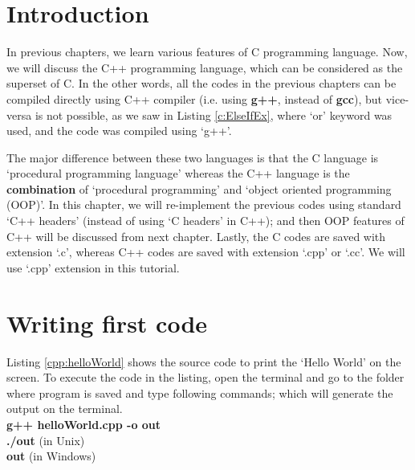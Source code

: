 \section{Introduction}

In previous chapters, we learn various features of C programming language. Now, we will discuss the C++ programming language, which can be considered as the superset of C. In the other words, all the codes in the previous chapters can be compiled directly using C++ compiler (i.e. using \textbf{g++}, instead of \textbf{gcc}), but vice-versa is not possible, as we saw in Listing \ref{c:ElseIfEx}, where `or' keyword was used, and the code was compiled using `g++'. 

The major difference between these two languages is that the C language is `procedural programming language' whereas the C++ language is the \textbf{combination} of `procedural programming' and `object oriented programming (OOP)'. In this chapter, we will re-implement the previous codes using standard `C++ headers' (instead of using `C headers' in C++); and then OOP features of C++ will be discussed from next chapter.  Lastly, the C codes are saved with extension `.c', whereas C++ codes are saved with extension `.cpp' or `.cc'. We will use `.cpp' extension in this tutorial. 

\section{Writing first code}
Listing \ref{cpp:helloWorld} shows the source code to print the `Hello World' on the screen. To execute the code in the listing, open the terminal and go to the folder where program is saved and type following commands; which will generate the output on the terminal. 
\\
\textbf{\textdollar { \ } g++ helloWorld.cpp -o out} \\
\textbf{\textdollar { \ }  ./out} (in Unix)\\
\textbf{\textdollar { \ }  out} (in Windows)

